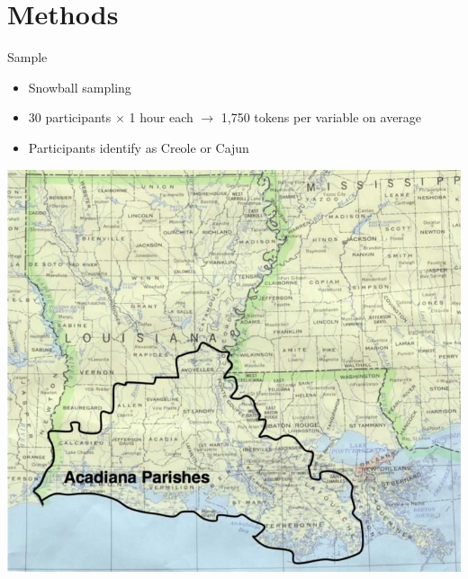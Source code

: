 \documentclass{beamer}\usepackage[]{graphicx}\usepackage[]{color}
\begin{document}
  \section{Methods}
    \begin{frame}{Sample}
      \begin{itemize}
        \item Snowball sampling \parencite{brown_pronominal_1988, giancarlo_dont_2019, rottet_language_1995}
        \item 30 participants $\times$ 1 hour each $\to$ 1,750 tokens per variable on average
        \item Participants identify as Creole or Cajun
      \end{itemize}
      \begin{center}
        \includegraphics[scale=0.2]{acadiana.jpg}
      \end{center}
    \end{frame}
\end{document}
